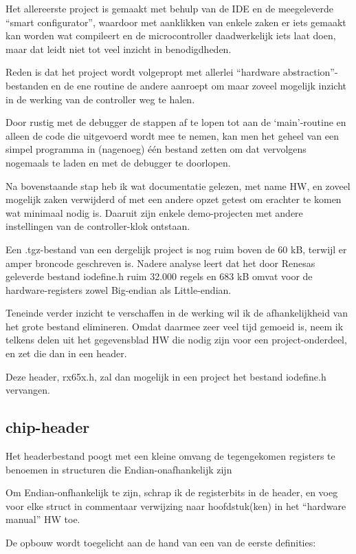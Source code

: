 \documentclass[a4paper, 11pt, fleqn, twoside]{scrartcl}%
\begin{document}
Het allereerste project is gemaakt met behulp van de IDE en de meegeleverde
``smart configurator'', waardoor met aanklikken van enkele zaken er iets
gemaakt kan worden wat compileert en de microcontroller daadwerkelijk iets
laat doen, maar dat leidt niet tot veel inzicht in benodigdheden.

Reden is dat het project wordt volgepropt met allerlei ``hardware 
abstraction''-bestanden en de ene routine de andere aanroept om maar 
zoveel mogelijk inzicht in de werking van de controller weg te halen.

Door rustig met de debugger de stappen af te lopen tot aan de `main'-routine
en alleen de code die uitgevoerd wordt mee te nemen, kan men het geheel van
een simpel programma in (nagenoeg) \'e\'en bestand zetten om dat vervolgens
nogemaals te laden en met de debugger te doorlopen.

Na bovenstaande stap heb ik wat documentatie gelezen, met name HW, en zoveel 
mogelijk zaken verwijderd of met een andere opzet getest om erachter te 
komen wat minimaal nodig is. Daaruit zijn enkele demo-projecten met andere
instellingen van de controller-klok ontstaan.

Een .tgz-bestand van een dergelijk project is nog ruim boven de 60 kB, terwijl 
er amper broncode geschreven is. Nadere analyse leert dat het door Renesas 
geleverde bestand iodefine.h ruim 32.000 regels en 683 kB omvat voor de 
hardware-registers zowel Big-endian als Little-endian.

Teneinde verder inzicht te verschaffen in de werking wil ik de afhankelijkheid
van het grote bestand elimineren. Omdat daarmee zeer veel tijd gemoeid is,
neem ik telkens delen uit het gegevensblad HW die nodig zijn voor een 
project-onderdeel, en zet die dan in een header.

Deze header, rx65x.h, zal dan mogelijk in een project het bestand iodefine.h vervangen.

\subsection{chip-header}
Het headerbestand poogt met een kleine omvang de tegengekomen registers te
benoemen in structuren die Endian-onafhankelijk zijn

Om Endian-onfhankelijk te zijn, schrap ik de registerbits in de header, en 
voeg voor elke struct in commentaar verwijzing naar hoofdstuk(ken) in het
``hardware manual'' HW toe.

De opbouw wordt toegelicht aan de hand van een van de eerste definities:
\end{document}
